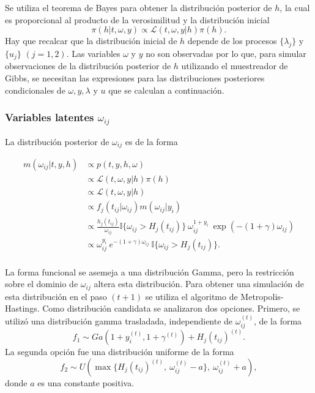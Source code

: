 \documentclass[11pt,a4paper]{article}
\begin{document}
Se utiliza el teorema de Bayes para obtener la distribución posterior de $h$, la cual es proporcional al producto de la verosimilitud y la distribución inicial $$\pi(h | t, \omega, y) \propto \mathcal{L}(t, \omega, y | h) \pi(h).$$ Hay que recalcar que la distribución inicial de $h$ depende de los procesos $\lbrace \lambda_j \rbrace$ y $\lbrace u_j \rbrace$ $(j = 1, 2)$.  Las variables $\omega$ y $y$ no son observadas por lo que, para simular observaciones de la distribución posterior de $h$ utilizando el muestreador de Gibbs, se necesitan las expresiones para las distribuciones posteriores condicionales de $\omega, y, \lambda$ y $u$ que se calculan a continuación.\\

\subsubsection*{Variables latentes $\omega_{ij}$}
\label{posterior_omega}

La distribución posterior de $\omega_{ij}$ es de la forma

\begin{align*}
m(\omega_{ij} | t, y, h) &\propto p(t, y, h, \omega)\\
&\propto \mathcal{L}(t, \omega, y |h) \pi(h)\\
&\propto \mathcal{L}(t, \omega, y |h)\\
&\propto f_j(t_{ij}|\omega_{ij})m(\omega_{ij}|y_i)\\
&\propto \frac{h_j(t_{ij})}{\omega_{ij}}\mathbb{I}\lbrace \omega_{ij} > H_j(t_{ij})\rbrace \  \omega_{ij}^{1+y_i} \ \exp (-(1+\gamma)\omega_{ij})\\
&\propto \omega_{ij}^{y_i} \ e^{-(1+\gamma)\omega_{ij}} \ \mathbb{I}\lbrace \omega_{ij} > H_j(t_{ij})\rbrace.\\
\end{align*}

La forma funcional se asemeja a una distribución Gamma, pero la restricción sobre el dominio de $\omega_{ij}$ altera esta distribución. Para obtener una simulación de esta distribución en el paso $(t+1)$ se utiliza el algoritmo de Metropolis-Hastings. Como distribución candidata se analizaron dos opciones. Primero, se utilizó una distribución gamma trasladada, independiente de $\omega_{ij}^{(t)}$, de la forma $$f_1 \sim Ga(1 + y_i^{(t)}, 1 + \gamma^{(t)}) + H_j(t_{ij})^{(t)}.$$ La segunda opción fue una distribución uniforme de la forma $$f_2 \sim U(\max \lbrace H_j(t_{ij})^{(t)}, \ \omega_{ij}^{(t)} - a \rbrace, \ \omega_{ij}^{(t)} + a),$$ donde $a$ es una constante positiva.\\
\end{document}
